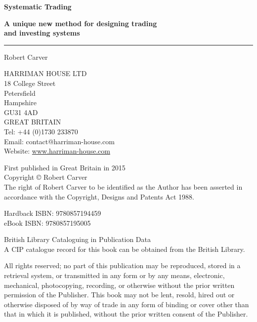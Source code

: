 \clearpage \thispagestyle{empty} \begin{center} \vspace*{0.22\textheight}
{\Huge\bfseries Systematic Trading\par}
\vspace{0.8em}
{\Large\bfseries A unique new method for designing trading\\and investing systems\par}
\vspace{1.6em} {\color{bookrule}\rule{0.18\textwidth}{0.8pt} \par } \vspace{2.1cm}
{\Large Robert Carver\par}
\end{center}

\clearpage \thispagestyle{empty} \begingroup \footnotesize \setlength{\parindent}{0pt} \textwidth {}\textwidth \raggedright HARRIMAN HOUSE LTD\\
18 College Street\\
Petersfield\\
Hampshire\\
GU31 4AD\\
GREAT BRITAIN\\
Tel: +44 (0)1730 233870\\
Email: contact@harriman-house.com\\
Website: \url{www.harriman-house.com} \par

\vspace{1.1em} First published in Great Britain in 2015\\
Copyright \copyright{} Robert Carver\\
The right of Robert Carver to be identified as the Author has been asserted in accordance with the Copyright, Designs and Patents Act 1988. \par

\vspace{1.1em} Hardback ISBN: 9780857194459\\
eBook ISBN: 9780857195005 \par

\vspace{1.1em} British Library Cataloguing in Publication Data\\
A CIP catalogue record for this book can be obtained from the British Library. \par

\vspace{0.85em} All rights reserved; no part of this publication may be reproduced, stored in a retrieval system, or transmitted in any form or by any means, electronic, mechanical, photocopying, recording, or otherwise without the prior written permission of the Publisher. This book may not be lent, resold, hired out or otherwise disposed of by way of trade in any form of binding or cover other than that in which it is published, without the prior written consent of the Publisher. \par

